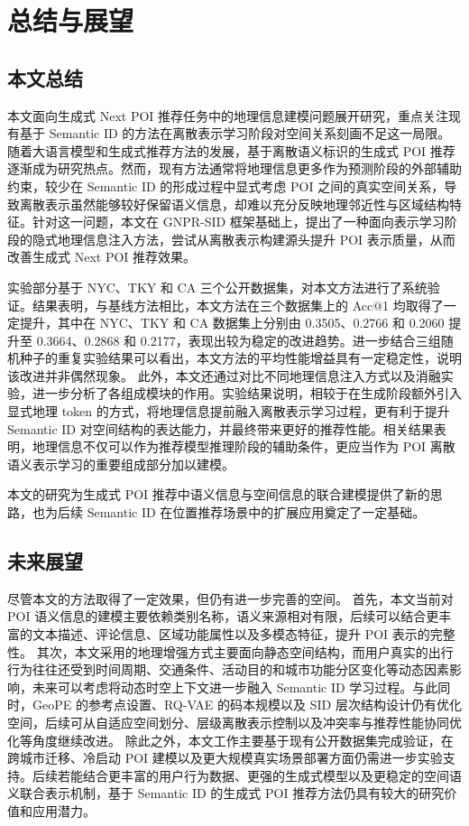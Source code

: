 \chapter{总结与展望}
\label{chap:conclusion}

\section{本文总结}

本文面向生成式 Next POI 推荐任务中的地理信息建模问题展开研究，重点关注现有基于 Semantic ID 的方法在离散表示学习阶段对空间关系刻画不足这一局限。随着大语言模型和生成式推荐方法的发展，基于离散语义标识的生成式 POI 推荐逐渐成为研究热点。然而，现有方法通常将地理信息更多作为预测阶段的外部辅助约束，较少在 Semantic ID 的形成过程中显式考虑 POI 之间的真实空间关系，导致离散表示虽然能够较好保留语义信息，却难以充分反映地理邻近性与区域结构特征。针对这一问题，本文在 GNPR-SID 框架基础上，提出了一种面向表示学习阶段的隐式地理信息注入方法，尝试从离散表示构建源头提升 POI 表示质量，从而改善生成式 Next POI 推荐效果。

实验部分基于 NYC、TKY 和 CA 三个公开数据集，对本文方法进行了系统验证。结果表明，与基线方法相比，本文方法在三个数据集上的 Acc@1 均取得了一定提升，其中在 NYC、TKY 和 CA 数据集上分别由 0.3505、0.2766 和 0.2060 提升至 0.3664、0.2868 和 0.2177，表现出较为稳定的改进趋势。进一步结合三组随机种子的重复实验结果可以看出，本文方法的平均性能增益具有一定稳定性，说明该改进并非偶然现象。
此外，本文还通过对比不同地理信息注入方式以及消融实验，进一步分析了各组成模块的作用。实验结果说明，相较于在生成阶段额外引入显式地理 token 的方式，将地理信息提前融入离散表示学习过程，更有利于提升 Semantic ID 对空间结构的表达能力，并最终带来更好的推荐性能。相关结果表明，地理信息不仅可以作为推荐模型推理阶段的辅助条件，更应当作为 POI 离散语义表示学习的重要组成部分加以建模。

本文的研究为生成式 POI 推荐中语义信息与空间信息的联合建模提供了新的思路，也为后续 Semantic ID 在位置推荐场景中的扩展应用奠定了一定基础。


\section{未来展望}
尽管本文的方法取得了一定效果，但仍有进一步完善的空间。
首先，本文当前对 POI 语义信息的建模主要依赖类别名称，语义来源相对有限，后续可以结合更丰富的文本描述、评论信息、区域功能属性以及多模态特征，提升 POI 表示的完整性。
其次，本文采用的地理增强方式主要面向静态空间结构，而用户真实的出行行为往往还受到时间周期、交通条件、活动目的和城市功能分区变化等动态因素影响，未来可以考虑将动态时空上下文进一步融入 Semantic ID 学习过程。与此同时，GeoPE 的参考点设置、RQ-VAE 的码本规模以及 SID 层次结构设计仍有优化空间，后续可从自适应空间划分、层级离散表示控制以及冲突率与推荐性能协同优化等角度继续改进。
除此之外，本文工作主要基于现有公开数据集完成验证，在跨城市迁移、冷启动 POI 建模以及更大规模真实场景部署方面仍需进一步实验支持。后续若能结合更丰富的用户行为数据、更强的生成式模型以及更稳定的空间语义联合表示机制，基于 Semantic ID 的生成式 POI 推荐方法仍具有较大的研究价值和应用潜力。

